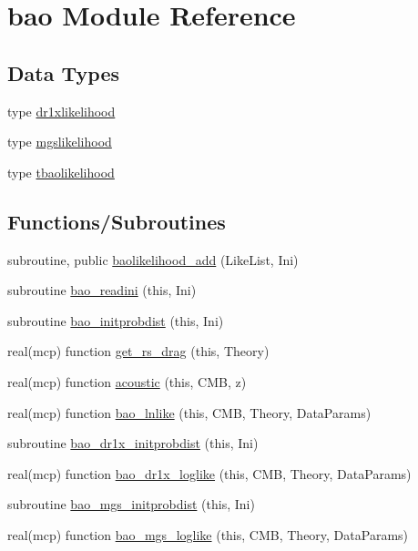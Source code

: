 \hypertarget{namespacebao}{}\section{bao Module Reference}
\label{namespacebao}
\subsection*{Data Types}
\begin{DoxyCompactItemize}
\item 
type \mbox{\hyperlink{structbao_1_1dr1xlikelihood}{dr1xlikelihood}}
\item 
type \mbox{\hyperlink{structbao_1_1mgslikelihood}{mgslikelihood}}
\item 
type \mbox{\hyperlink{structbao_1_1tbaolikelihood}{tbaolikelihood}}
\end{DoxyCompactItemize}
\subsection*{Functions/\+Subroutines}
\begin{DoxyCompactItemize}
\item 
subroutine, public \mbox{\hyperlink{namespacebao_a1e83b8129197b47271286760d4c11866}{baolikelihood\+\_\+add}} (Like\+List, Ini)
\item 
subroutine \mbox{\hyperlink{namespacebao_af2e429eb5aae0de7f70a321537f77861}{bao\+\_\+readini}} (this, Ini)
\item 
subroutine \mbox{\hyperlink{namespacebao_a42ad1b0022e37bb1e4457c7a4e329b12}{bao\+\_\+initprobdist}} (this, Ini)
\item 
real(mcp) function \mbox{\hyperlink{namespacebao_af2ea26ba323749ae85e04fe46904d115}{get\+\_\+rs\+\_\+drag}} (this, Theory)
\item 
real(mcp) function \mbox{\hyperlink{namespacebao_a42575daf8f5c1b68a1a7ddf8bd087988}{acoustic}} (this, C\+MB, z)
\item 
real(mcp) function \mbox{\hyperlink{namespacebao_a9a4c24c4606056286bb571c62350ccb3}{bao\+\_\+lnlike}} (this, C\+MB, Theory, Data\+Params)
\item 
subroutine \mbox{\hyperlink{namespacebao_a01a1351c073ed9d3a96aece01f8c368b}{bao\+\_\+dr1x\+\_\+initprobdist}} (this, Ini)
\item 
real(mcp) function \mbox{\hyperlink{namespacebao_a566724d43b5fe7348c615930295ffefb}{bao\+\_\+dr1x\+\_\+loglike}} (this, C\+MB, Theory, Data\+Params)
\item 
subroutine \mbox{\hyperlink{namespacebao_aec7bdc5f03a9da432a0345932d1401bd}{bao\+\_\+mgs\+\_\+initprobdist}} (this, Ini)
\item 
real(mcp) function \mbox{\hyperlink{namespacebao_aa39f8163fd5d4a39d7d83bab1a485ee2}{bao\+\_\+mgs\+\_\+loglike}} (this, C\+MB, Theory, Data\+Params)
\end{DoxyCompactItemize}
